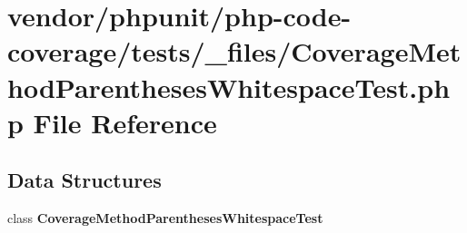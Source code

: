 \section{vendor/phpunit/php-\/code-\/coverage/tests/\+\_\+files/\+Coverage\+Method\+Parentheses\+Whitespace\+Test.php File Reference}
\label{php-code-coverage_2tests_2__files_2_coverage_method_parentheses_whitespace_test_8php}
\subsection*{Data Structures}
\begin{DoxyCompactItemize}
\item 
class {\bf Coverage\+Method\+Parentheses\+Whitespace\+Test}
\end{DoxyCompactItemize}
